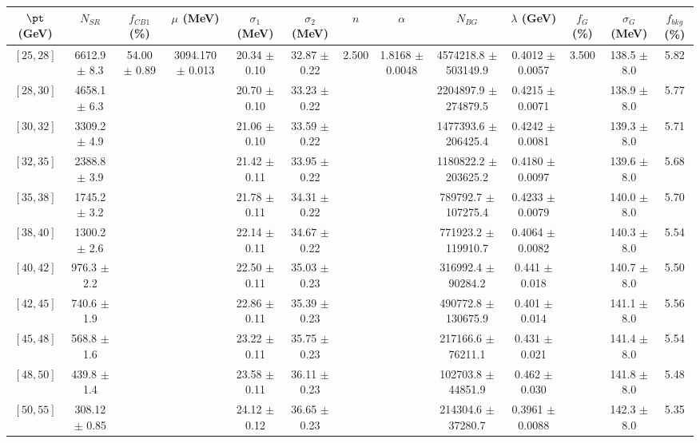 \begin{tabular}{c||c|c|c|c|c|c|c|c|c|c|c||c}
$\pt$ (GeV) & $N_{SR}$ & $f_{CB1}$ (\%) & $\mu$ (MeV) & $\sigma_1$ (MeV) & $\sigma_2$ (MeV) & $n$ & $\alpha$ & $N_{BG}$ & $\lambda$ (GeV) & $f_G$ (\%) & $\sigma_G$ (MeV) & $f_{bkg}$ (\%) \\
\hline
$[25, 28]$ & 6612.9 $\pm$ 8.3 & \multirow{19}{*}{54.00 $\pm$ 0.89} & \multirow{19}{*}{3094.170 $\pm$ 0.013} & 20.34 $\pm$ 0.10 & 32.87 $\pm$ 0.22 & \multirow{19}{*}{2.500} & \multirow{19}{*}{1.8168 $\pm$ 0.0048} & 4574218.8 $\pm$ 503149.9 & 0.4012 $\pm$ 0.0057 & \multirow{19}{*}{3.500} & 138.5 $\pm$ 8.0 & 5.82\\
$[28, 30]$ & 4658.1 $\pm$ 6.3 &  &  & 20.70 $\pm$ 0.10 & 33.23 $\pm$ 0.22 &  &  & 2204897.9 $\pm$ 274879.5 & 0.4215 $\pm$ 0.0071 &  & 138.9 $\pm$ 8.0 & 5.77\\
$[30, 32]$ & 3309.2 $\pm$ 4.9 &  &  & 21.06 $\pm$ 0.10 & 33.59 $\pm$ 0.22 &  &  & 1477393.6 $\pm$ 206425.4 & 0.4242 $\pm$ 0.0081 &  & 139.3 $\pm$ 8.0 & 5.71\\
$[32, 35]$ & 2388.8 $\pm$ 3.9 &  &  & 21.42 $\pm$ 0.11 & 33.95 $\pm$ 0.22 &  &  & 1180822.2 $\pm$ 203625.2 & 0.4180 $\pm$ 0.0097 &  & 139.6 $\pm$ 8.0 & 5.68\\
$[35, 38]$ & 1745.2 $\pm$ 3.2 &  &  & 21.78 $\pm$ 0.11 & 34.31 $\pm$ 0.22 &  &  & 789792.7 $\pm$ 107275.4 & 0.4233 $\pm$ 0.0079 &  & 140.0 $\pm$ 8.0 & 5.70\\
$[38, 40]$ & 1300.2 $\pm$ 2.6 &  &  & 22.14 $\pm$ 0.11 & 34.67 $\pm$ 0.22 &  &  & 771923.2 $\pm$ 119910.7 & 0.4064 $\pm$ 0.0082 &  & 140.3 $\pm$ 8.0 & 5.54\\
$[40, 42]$ & 976.3 $\pm$ 2.2 &  &  & 22.50 $\pm$ 0.11 & 35.03 $\pm$ 0.23 &  &  & 316992.4 $\pm$ 90284.2 & 0.441 $\pm$ 0.018 &  & 140.7 $\pm$ 8.0 & 5.50\\
$[42, 45]$ & 740.6 $\pm$ 1.9 &  &  & 22.86 $\pm$ 0.11 & 35.39 $\pm$ 0.23 &  &  & 490772.8 $\pm$ 130675.9 & 0.401 $\pm$ 0.014 &  & 141.1 $\pm$ 8.0 & 5.56\\
$[45, 48]$ & 568.8 $\pm$ 1.6 &  &  & 23.22 $\pm$ 0.11 & 35.75 $\pm$ 0.23 &  &  & 217166.6 $\pm$ 76211.1 & 0.431 $\pm$ 0.021 &  & 141.4 $\pm$ 8.0 & 5.54\\
$[48, 50]$ & 439.8 $\pm$ 1.4 &  &  & 23.58 $\pm$ 0.11 & 36.11 $\pm$ 0.23 &  &  & 102703.8 $\pm$ 44851.9 & 0.462 $\pm$ 0.030 &  & 141.8 $\pm$ 8.0 & 5.48\\
$[50, 55]$ & 308.12 $\pm$ 0.85 &  &  & 24.12 $\pm$ 0.12 & 36.65 $\pm$ 0.23 &  &  & 214304.6 $\pm$ 37280.7 & 0.3961 $\pm$ 0.0088 &  & 142.3 $\pm$ 8.0 & 5.35\\

\end{tabular}
